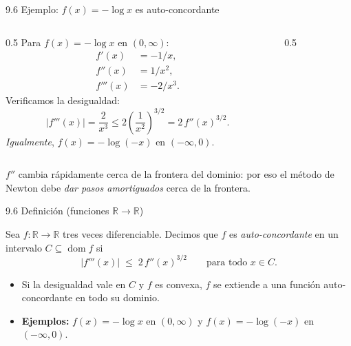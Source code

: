 \documentclass[10pt,aspectratio=169]{beamer}
\newcommand{\R}{\mathbb{R}}
\newcommand{\x}{\mathbf{x}}
\newcommand{\dom}{\operatorname{dom}}
\begin{document}
\begin{frame}{9.6 Ejemplo: $f(x) = -\log x$ es auto-concordante}
  \begin{columns}[T]
    \begin{column}{0.5\textwidth}
      Para $f(x) = -\log x$ en $(0,\infty)$:
      \begin{align*}
        f'(x) &= -1/x, \\
        f''(x) &= 1/x^{2}, \\
        f'''(x) &= -2/x^{3}.
      \end{align*}
      Verificamos la desigualdad:
      \[
        |f'''(x)| = \frac{2}{x^{3}} \le 2\left(\frac{1}{x^{2}}\right)^{3/2}
        = 2\, f''(x)^{3/2}.
      \]
      \emph{Igualmente}, $f(x) = -\log(-x)$ en $(-\infty,0)$.
    \end{column}
    \begin{column}{0.5\textwidth}
      \begin{center}
      \end{center}
    \end{column}
  \end{columns}
  \begin{center}\scriptsize
    $f''$ cambia rápidamente cerca de la frontera del dominio: por eso
    el método de Newton debe \emph{dar pasos amortiguados} cerca de la frontera.
  \end{center}
\end{frame}

\begin{frame}{9.6 Definición (funciones $\R \to \R$)}
  \begin{definition}
    Sea $f:\R \to \R$ tres veces diferenciable. Decimos que $f$ es \emph{auto-concordante}
    en un intervalo $C \subseteq \dom f$ si
    \[
      |f'''(x)| \;\le\; 2\, f''(x)^{3/2}
      \qquad \text{para todo } x \in C.
    \]
  \end{definition}
  \begin{itemize}
    \item Si la desigualdad vale en $C$ y $f$ es convexa, $f$ se extiende a
          una función auto-concordante en todo su dominio.
    \item \textbf{Ejemplos:} $f(x) = -\log x$ en $(0,\infty)$ y $f(x) = -\log(-x)$
          en $(-\infty,0)$.
  \end{itemize}
\end{frame}
\end{document}
